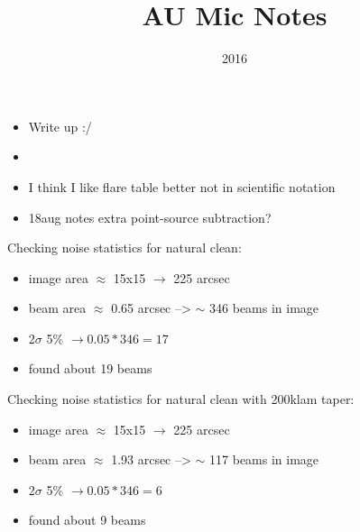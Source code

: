 \documentclass[a4paper]{tufte-handout}
\title{AU Mic Notes}
\date{2016}
\begin{document}
\maketitle


\begin{tasks}
	\begin{itemize}
		\item Write up :/
	\end{itemize}
\end{tasks}


\begin{maybe}
	\begin{itemize}
		\item
	\end{itemize}
\end{maybe}


\begin{mer}
	\begin{itemize}
		\item I think I like flare table better not in scientific notation
    \item 18aug notes extra point-source subtraction?
	\end{itemize}

\end{mer}

Checking noise statistics for natural clean:\\
\begin{itemize}
  \item image area $\approx$ 15x15 $\to$ 225 arcsec
  \item beam area $\approx$ 0.65 arcsec --> $\sim$ 346 beams in image
  \item 2$\sigma$ 5\% $\to 0.05 * 346 = 17$
  \item found about 19 beams
\end{itemize}

\noindent Checking noise statistics for natural clean with 200klam taper:\\
\begin{itemize}
  \item image area $\approx$ 15x15 $\to$ 225 arcsec
  \item beam area $\approx$ 1.93 arcsec --> $\sim$ 117 beams in image
  \item 2$\sigma$ 5\% $\to 0.05 * 346 = 6$
  \item found about 9 beams
\end{itemize}
\end{document}
